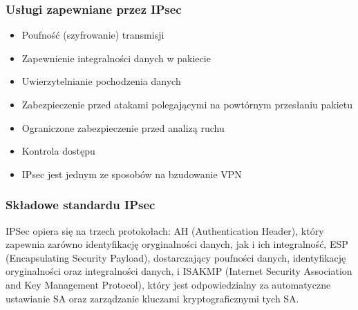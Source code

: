 \documentclass[12pt]{article}
\begin{document}
    \subsubsection{Usługi zapewniane przez IPsec}
    \begin{itemize}
        \item Poufność (szyfrowanie) transmisji
        \item Zapewnienie integralności danych w pakiecie
        \item Uwierzytelnianie pochodzenia danych
        \item Zabezpieczenie przed atakami polegającymi na powtórnym przesłaniu pakietu
        \item Ograniczone zabezpieczenie przed analizą ruchu
        \item Kontrola dostępu
        \item IPsec jest jednym ze sposobów na bzudowanie VPN
    \end{itemize}
    
    \subsubsection{Składowe standardu IPsec}
    IPSec opiera się na trzech protokołach: AH (Authentication Header), który zapewnia zarówno identyfikację oryginalności danych, jak i ich integralność, ESP (Encapsulating Security Payload), dostarczający poufności danych, identyfikację oryginalności oraz integralności danych, i ISAKMP (Internet Security Association and Key Management Protocol), który jest odpowiedzialny za automatyczne ustawianie SA oraz zarządzanie kluczami kryptograficznymi tych SA.
    
\end{document}
